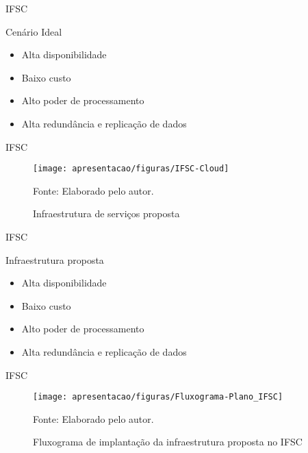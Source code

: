 \documentclass{beamer}
\begin{document}
\begin{frame}{IFSC}
    \begin{block}{Cenário Ideal}
        \begin{itemize}
            \item Alta disponibilidade
            \item Baixo custo
            \item Alto poder de processamento
            \item Alta redundância e replicação de dados
        \end{itemize}
    \end{block}
\end{frame}


\begin{frame}{IFSC}
    \begin{figure}[!htpb]
    	\centering
    	\caption{Infraestrutura de serviços proposta}
        \texttt{[image: apresentacao/figuras/IFSC-Cloud]}
        
    	Fonte: Elaborado pelo autor.
     	\label{wordpress_post}
    \end{figure}
\end{frame}


\begin{frame}{IFSC}
    \begin{block}{Infraestrutura proposta}
        \begin{itemize}
            \item Alta disponibilidade \checkmark
            \item Baixo custo \checkmark
            \item Alto poder de processamento \checkmark
            \item Alta redundância e replicação de dados \checkmark
        \end{itemize}
    \end{block}
\end{frame}


\begin{frame}{IFSC}
    \begin{figure}[!htpb]
    	\centering
    	\caption{Fluxograma de implantação da infraestrutura proposta no IFSC}
        \texttt{[image: apresentacao/figuras/Fluxograma-Plano\_IFSC]}
        
    	Fonte: Elaborado pelo autor.
     	\label{wordpress_post}
    \end{figure}
\end{frame}
\end{document}
